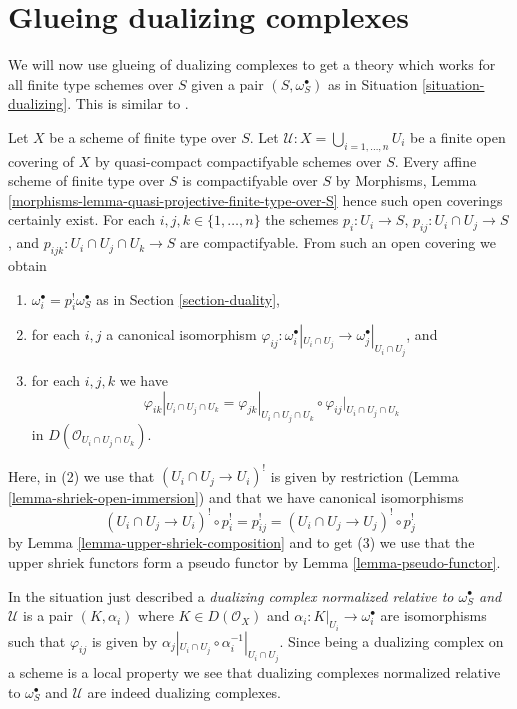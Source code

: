 \section{Glueing dualizing complexes}
\label{section-glue}

\noindent
We will now use glueing of dualizing complexes to get a theory which works for
all finite type schemes over $S$ given a pair $(S, \omega_S^\bullet)$
as in Situation \ref{situation-dualizing}. This is similar to
\cite[Remark on page 310]{RD}.

\medskip\noindent
Let $X$ be a scheme of finite type over $S$.
Let $\mathcal{U} : X = \bigcup_{i = 1, \ldots, n} U_i$
be a finite open covering of $X$ by quasi-compact compactifyable
schemes over $S$. Every affine scheme of finite type
over $S$ is compactifyable over $S$ by
Morphisms, Lemma \ref{morphisms-lemma-quasi-projective-finite-type-over-S}
hence such open coverings certainly exist.
For each $i, j, k \in \{1, \ldots, n\}$
the schemes $p_i : U_i \to S$, $p_{ij} : U_i \cap U_j \to S$,
and $p_{ijk} : U_i \cap U_j \cap U_k \to S$ are compactifyable.
From such an open covering we obtain
\begin{enumerate}
\item $\omega_i^\bullet = p_i^!\omega_S^\bullet$
as in Section \ref{section-duality},
\item for each $i, j$ a canonical isomorphism
$\varphi_{ij} :
\omega_i^\bullet|_{U_i \cap U_j} \to \omega_j^\bullet|_{U_i \cap U_j}$, and
\item
\label{item-cocycle-glueing}
for each $i, j, k$ we have
$$
\varphi_{ik}|_{U_i \cap U_j \cap U_k} =
\varphi_{jk}|_{U_i \cap U_j \cap U_k} \circ
\varphi_{ij}|_{U_i \cap U_j \cap U_k}
$$
in $D(\mathcal{O}_{U_i \cap U_j \cap U_k})$.
\end{enumerate}
Here, in (2) we use that $(U_i \cap U_j \to U_i)^!$
is given by restriction (Lemma \ref{lemma-shriek-open-immersion})
and that we have canonical isomorphisms
$$
(U_i \cap U_j \to U_i)^! \circ p_i^! = p_{ij}^! =
(U_i \cap U_j \to U_j)^! \circ p_j^!
$$
by Lemma \ref{lemma-upper-shriek-composition} and to get (3) we use
that the upper shriek functors form a pseudo functor by
Lemma \ref{lemma-pseudo-functor}.

\medskip\noindent
In the situation just described a
{\it dualizing complex normalized relative to $\omega_S^\bullet$
and $\mathcal{U}$} is a pair $(K, \alpha_i)$ where $K \in D(\mathcal{O}_X)$
and $\alpha_i : K|_{U_i} \to \omega_i^\bullet$ are isomorphisms
such that $\varphi_{ij}$ is given by
$\alpha_j|_{U_i \cap U_j} \circ \alpha_i^{-1}|_{U_i \cap U_j}$.
Since being a dualizing complex on a scheme is a local property
we see that dualizing complexes normalized relative to $\omega_S^\bullet$
and $\mathcal{U}$ are indeed dualizing complexes.

